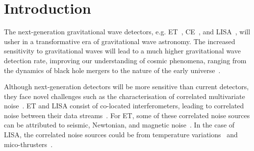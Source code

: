 \documentclass[%
 reprint,
 amsmath,amssymb,
 aps,
]{revtex4-2}
\begin{document}
\section{Introduction}

The next-generation gravitational wave detectors, e.g. \ac{ET}~\cite{Punturo_2010}, \ac{CE}~\cite{CE_horizon_study}, and \ac{LISA}~\cite{LISA_science_case}, will usher in a transformative era of gravitational wave astronomy. 
The increased sensitivity to gravitational waves will lead to a much higher gravitational wave detection rate, improving our understanding of cosmic phenomena, ranging from the dynamics of black hole mergers to the nature of the early universe~\cite{ET_science_case, Maggiore_2020_ET_science_case, Branchesi_2023_ET_science_case, CE_horizon_study, LISA_science_case}.


Although next-generation detectors will be more sensitive than current detectors, they face novel challenges such as the characterisation of correlated multivariate noise~\cite{ET_design_report,LISA_design_report}.
\ac{ET} and \ac{LISA} consist of co-located interferometers, leading to correlated noise between their data streams~\cite{Janssens2023}. For \ac{ET}, some of these correlated noise sources can be attributed to seismic, Newtonian, and magnetic noise~\cite{Ball_lightning_strokes, Janssens_newtonian_seismic, Janssens_magnetic_noise}. 
In the case of \ac{LISA}, the correlated noise sources could be from temperature variations~\cite{lisa_temp_noise} and mico-thrusters~\cite{lisa_thrusters_noise}. 
\end{document}

